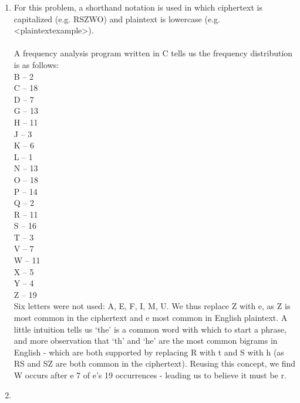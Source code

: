 \documentclass[12pt,letterpaper]{article}
\begin{document}
\pagestyle{fancy}
\rhead{\today}

\begin{enumerate}

    \item
        For this problem, a shorthand notation is used in which ciphertext is capitalized (e.g. RSZWO) and plaintext is lowercase (e.g. <plaintextexample>).\\\\
        A frequency analysis program written in C tells us the frequency distribution is as follows:\\
            B -- 2\\
            C -- 18\\
            D -- 7\\ 
            G -- 13\\
            H -- 11\\
            J -- 3\\
            K -- 6\\
            L -- 1\\
            N -- 13\\
            O -- 18\\
            P -- 14\\
            Q -- 2\\
            R -- 11\\
            S -- 16\\
            T -- 3\\
            V -- 7\\
            W -- 11\\
            X -- 5\\
            Y -- 4\\
            Z -- 19\\
        Six letters were not used: A, E, F, I, M, U.
        We thus replace Z with e, as Z is most common in the ciphertext and e most common in English plaintext.
        A little intuition tells us `the' is a common word with which to start a phrase, and more observation that `th' and `he' are the most common bigrams in English - which are both supported by replacing R with t and S with h (as RS and SZ are both common in the ciphertext).
        Reusing this concept, we find W occurs after e 7 of e's 19 occurrences - leading us to believe it must be r.
        


    \item

\end{enumerate}
\end{document}
